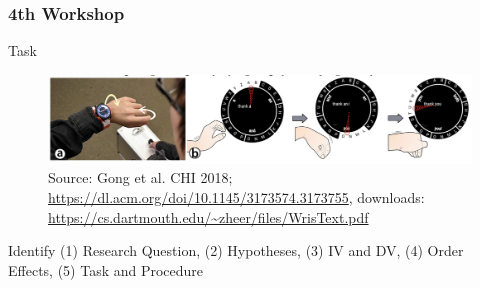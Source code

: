 \documentclass{beamer}
\begin{document}

\begin{frame}
	\frametitle{4th Workshop}
	\footnotesize

	\begin{block}{Task}	
	\begin{figure}
		\includegraphics[width=0.6\linewidth]{wrist}
		\caption{Source: Gong et al. CHI 2018; \url{https://dl.acm.org/doi/10.1145/3173574.3173755}, downloads: \url{https://cs.dartmouth.edu/~zheer/files/WrisText.pdf}}
	\end{figure}
	
	Identify (1) Research Question, (2) Hypotheses, (3) IV and DV, (4) Order Effects, (5) Task and Procedure

	\end{block}
\end{frame}
\end{document}
